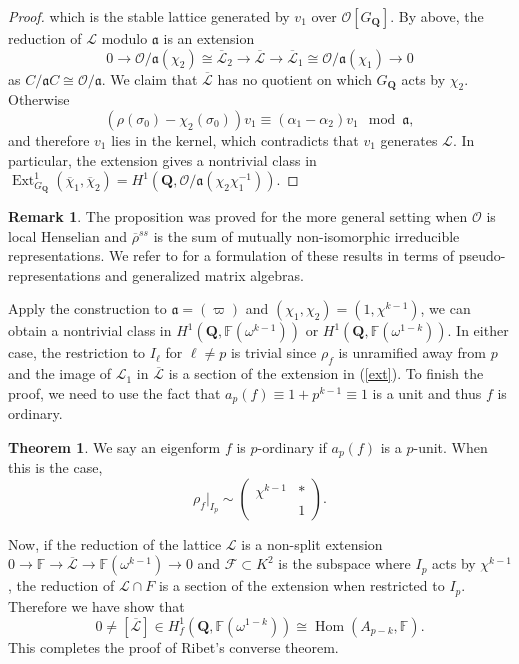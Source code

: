 \documentclass[11pt]{amsart}
\newcommand{\Q}{\mathbf{Q}}  %
\newcommand{\ir}{\mathcal{O}} %
\newcommand{\Hom}{\operatorname{Hom}}
\newcommand{\Ext}{\operatorname{Ext}}
\newcommand{\mat}[1]{ \begin{pmatrix}
#1
\end{pmatrix} }
\theoremstyle{definition}
\theoremstyle{definition}
\newtheorem{theorem}[definition]{Theorem}
\theoremstyle{definition}
\theoremstyle{definition}
\newtheorem{remark}[definition]{Remark}
\theoremstyle{definition}
\theoremstyle{definition}
\begin{document}
\begin{proof}
    which is the stable lattice generated by $v_1$ over $\ir[G_\Q]$.
    By above, the reduction of $\mathcal{L}$ modulo $\mathfrak{a}$ is an extension
        \begin{equation}\label{ext}
            0\to \ir/\mathfrak{a}(\chi_2)\cong \overline{\mathcal{L}}_2\to\overline{\mathcal{L}}
            \to \overline{\mathcal{L}}_1\cong \ir/\mathfrak{a}(\chi_1)\to 0
        \end{equation}
    as $C/\mathfrak{a}C\cong \ir/\mathfrak{a}$.
    We claim that $\overline{\mathcal{L}}$ has no quotient on which
    $G_\Q$ acts by $\chi_2$. Otherwise
    \begin{equation*}
        (\rho(\sigma_0)-\chi_2(\sigma_0)) v_1\equiv (\alpha_1-\alpha_2)v_1\mod \mathfrak{a},
    \end{equation*}
    and therefore $v_1$ lies in the kernel, which contradicts that $v_1$ generates $\mathcal{L}$.
    In particular, the extension gives a nontrivial class in
    $\Ext^1_{G_\Q}(\overline{\chi}_1,\overline{\chi}_2)=H^1(\Q, \ir/\mathfrak{a}(\chi_2\chi_1^{-1}))$.
\end{proof}
\begin{remark}
    The proposition was proved for the more general setting
    when $\ir$ is local Henselian and $\overline{\rho}^{ss}$
    is the sum of mutually non-isomorphic irreducible representations.
    We refer to \cite[chapter 1]{bell}
    for a formulation of these results in terms of 
    pseudo-representations and generalized matrix algebras.
\end{remark}

Apply the construction to $\mathfrak{a}=(\varpi)$ and $(\chi_1,\chi_2)=(1,\chi^{k-1})$,
we can obtain a nontrivial class in $H^1(\Q,\mathbb{F}(\omega^{k-1}))$ or $H^1(\Q,\mathbb{F}(\omega^{1-k}))$.
In either case, the restriction to $I_\ell$ for $\ell\neq p$ is
trivial since $\rho_f$ is unramified away from $p$ and
the image of $\mathcal{L}_1$ in $\overline{\mathcal{L}}$
is a section of the extension in (\ref{ext}).
To finish the proof, we need to use the fact that $a_p(f)\equiv 1+p^{k-1}\equiv 1$
is a unit and thus $f$ is ordinary.
\begin{theorem}
    We say an eigenform $f$ is $p$-ordinary if $a_p(f)$ is a $p$-unit.
    When this is the case,
    \begin{equation*}
        \rho_f\vert_{I_p}\sim \mat{\chi^{k-1}& *\\&1}.
    \end{equation*}
\end{theorem}
Now, if the reduction of the lattice $\mathcal{L}$ is
a non-split extension $0\to \mathbb{F} \to\overline{\mathcal{L}}
\to \mathbb{F}(\omega^{k-1})\to 0$
and $\mathcal{F}\subset K^2$ is the subspace where $I_p$ acts by $\chi^{k-1}$,
the reduction of $\mathcal{L}\cap F$ is a section of the extension
when restricted to $I_p$. Therefore we have show that
\begin{equation*}
    0\neq [\overline{\mathcal{L}}]\in H^1_f(\Q, \mathbb{F}(\omega^{1-k}))
    \cong \Hom(A_{p-k}, \mathbb{F}).
\end{equation*}
This completes the proof of Ribet's converse theorem.
\end{document}
